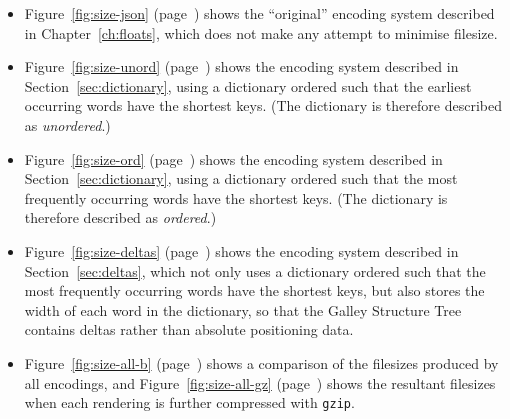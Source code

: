 \begin{itemize}

 \item Figure~\ref{fig:size-json} (page~\pageref{fig:size-json}) shows the ``original'' encoding system described in Chapter~\ref{ch:floats}, which does not make any attempt to minimise filesize.

 \item Figure~\ref{fig:size-unord} (page~\pageref{fig:size-unord}) shows the encoding system described in Section~\ref{sec:dictionary}, using a dictionary ordered such that the earliest occurring words have the shortest keys. (The dictionary is therefore described as \emph{unordered}.)

 \item Figure~\ref{fig:size-ord} (page~\pageref{fig:size-ord}) shows the encoding system described in Section~\ref{sec:dictionary}, using a dictionary ordered such that the most frequently occurring words have the shortest keys. (The dictionary is therefore described as \emph{ordered}.)

 \item Figure~\ref{fig:size-deltas} (page~\pageref{fig:size-deltas}) shows the encoding system described in Section~\ref{sec:deltas}, which not only uses a dictionary ordered such that the most frequently occurring words have the shortest keys, but also stores the width of each word in the dictionary, so that the Galley Structure Tree contains deltas rather than absolute positioning data.

 \item Figure~\ref{fig:size-all-b} (page~\pageref{fig:size-all-b}) shows a comparison of the filesizes produced by all encodings, and Figure~\ref{fig:size-all-gz} (page~\pageref{fig:size-all-gz}) shows the resultant filesizes when each rendering is further compressed with \texttt{gzip}.
\end{itemize}


